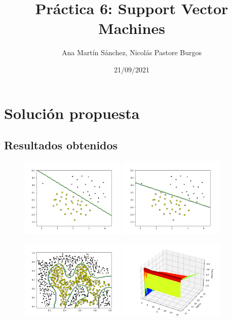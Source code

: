 \documentclass[11pt]{article}
\title{Práctica 6: Support Vector Machines}
\author{Ana Martín Sánchez, Nicolás Pastore Burgos}
\date{21/09/2021}
\begin{document}
\maketitle

\section{Solución propuesta}

\subsection{Resultados obtenidos}

 \begin{figure}[h!]
    \begin{center}
    \includegraphics[width=0.45\textwidth]{Figura1.png}
    \includegraphics[width=0.45\textwidth]{Figura2.png}
    \end{center}
 \end{figure}

 \begin{figure}[h!]
    \begin{center}
    \includegraphics[width=0.45\textwidth]{Figura3.png}
    \includegraphics[width=0.45\textwidth]{Figura4.png}
    \end{center}
 \end{figure}
\end{document}
